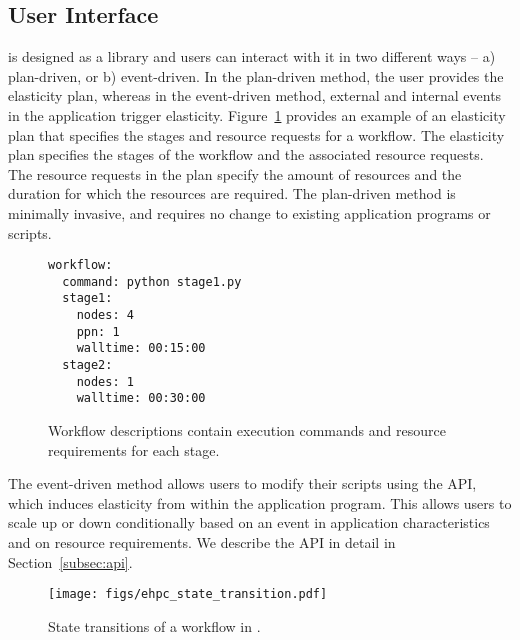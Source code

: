 \subsection{User Interface}
\label{subsec:user}

\systemname is designed as a library and users can interact with it in
two different ways -- a) plan-driven, or b) event-driven. In the plan-driven
method, the user provides the elasticity plan, whereas in the event-driven
method, external and internal events in the application trigger elasticity.
Figure~\ref{fig:wf_template} provides an example of an elasticity plan that
specifies the stages and resource requests for a workflow. The
elasticity plan specifies the stages of the workflow and the associated
resource requests.
The resource requests in the plan specify the amount of resources
and the duration for which the resources are required. The
plan-driven method is minimally invasive, and requires no change to
existing application programs or scripts.

\begin{figure}
\begin{verbatim}
workflow:
  command: python stage1.py
  stage1:
    nodes: 4
    ppn: 1
    walltime: 00:15:00
  stage2:
    nodes: 1
    walltime: 00:30:00
\end{verbatim}
\caption{\small Workflow descriptions contain execution commands and resource
requirements for each stage.}
\label{fig:wf_template}
 \vspace{-0.5cm}
\end{figure}

The event-driven method allows users to modify their scripts using the \systemname
API, which induces elasticity from within the application program. This allows
users to scale up or down conditionally based on an event in application characteristics
and on resource requirements. 
We describe the API in detail in Section~\ref{subsec:api}.

\begin{figure} [b]
\begin{center}
    \texttt{[image: figs/ehpc\_state\_transition.pdf]}
\end{center}
 \caption{\small State transitions of a workflow in \systemname.}
 \label{fig:ehpc_state_transition}
 \vspace{-0.3cm}
\end{figure}

